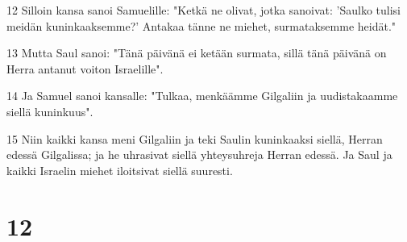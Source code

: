 \par 12 Silloin kansa sanoi Samuelille: "Ketkä ne olivat, jotka sanoivat: 'Saulko tulisi meidän kuninkaaksemme?' Antakaa tänne ne miehet, surmataksemme heidät."
\par 13 Mutta Saul sanoi: "Tänä päivänä ei ketään surmata, sillä tänä päivänä on Herra antanut voiton Israelille".
\par 14 Ja Samuel sanoi kansalle: "Tulkaa, menkäämme Gilgaliin ja uudistakaamme siellä kuninkuus".
\par 15 Niin kaikki kansa meni Gilgaliin ja teki Saulin kuninkaaksi siellä, Herran edessä Gilgalissa; ja he uhrasivat siellä yhteysuhreja Herran edessä. Ja Saul ja kaikki Israelin miehet iloitsivat siellä suuresti.

\chapter{12}

